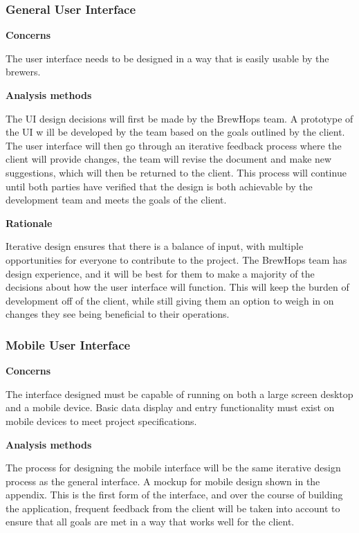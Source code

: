 \documentclass[draftclsnofoot,onecolumn,letterpaper,10pt]{IEEEtran}
\begin{document}
		\subsubsection{General User Interface}
			\textbf{Concerns}

			The user interface needs to be designed in a way that is easily usable by the brewers.

			\textbf{Analysis methods}

			The UI design decisions will first be made by the BrewHops team. A prototype of the UI w ill be developed by the team based on the goals outlined by the client. The user interface will then go through an iterative feedback process where the client will provide changes, the team will revise the document and make new suggestions, which will then be returned to the client. This process will continue until both parties have verified that the design is both achievable by the development team and meets the goals of the client.

			\textbf{Rationale}

			Iterative design ensures that there is a balance of input, with multiple opportunities for everyone to contribute to the project. The BrewHops team has design experience, and it will be best for them to make a majority of the decisions about how the user interface will function. This will keep the burden of development off of the client, while still giving them an option to weigh in on changes they see being beneficial to their operations.

			\subsubsection{Mobile User Interface}
				\textbf{Concerns}

				The interface designed must be capable of running on both a large screen desktop and a mobile device. Basic data display and entry functionality must exist on mobile devices to meet project specifications.

				\textbf{Analysis methods}

				The process for designing the mobile interface will be the same iterative design process as the general interface. A mockup for mobile design shown in the appendix. This is the first form of the interface, and over the course of building the application, frequent feedback from the client will be taken into account to ensure that all goals are met in a way that works well for the client.
\end{document}
